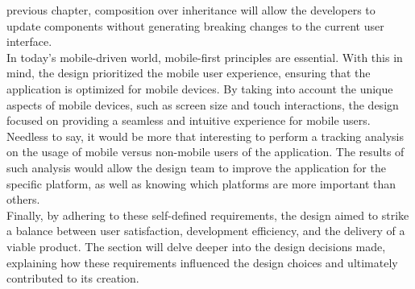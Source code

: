 \documentclass[./memory.tex]{subfiles}
\begin{document}
previous chapter, composition over inheritance will allow the developers to
update components without generating breaking changes to the current user
interface.
\\
In today's mobile-driven world, mobile-first principles are essential. With this
in mind, the design prioritized the mobile user experience, ensuring that the
application is optimized for mobile devices. By taking into account the unique
aspects of mobile devices, such as screen size and touch interactions, the
design focused on providing a seamless and intuitive experience for mobile
users. Needless to say, it would be more that interesting to perform a tracking
analysis on the usage of mobile versus non-mobile users of the application. The
results of such analysis would allow the design team to improve the application
for the specific platform, as well as knowing which platforms are more important
than others.
\\[8pt]
Finally, by adhering to these self-defined requirements, the design aimed to
strike a balance between user satisfaction, development efficiency, and the
delivery of a viable product. The section will delve deeper into the design
decisions made, explaining how these requirements influenced the design choices
and ultimately contributed to its creation.
\end{document}
